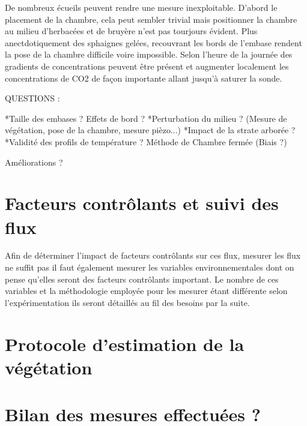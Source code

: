 De nombreux écueils peuvent rendre une mesure inexploitable. D'abord le placement de la chambre, cela peut sembler trivial mais positionner la chambre au milieu d'herbacées et de bruyère n'est pas tourjours évident. Plus anectdotiquement des sphaignes gelées, recouvrant les bords de l'embase rendent la pose de la chambre difficile voire impossible. Selon l'heure de la journée des gradients de concentrations peuvent être présent et augmenter localement les concentrations de CO2 de façon importante allant jusqu'à saturer la sonde.

QUESTIONS :

*Taille des embases ? Effets de bord ?
*Perturbation du milieu ? (Mesure de végétation, pose de la chambre, mesure pièzo...)
*Impact de la strate arborée ?
*Validité des profils de température ?
Méthode de Chambre fermée (Biais ?)

Améliorations ? 


\section{Facteurs contrôlants et suivi des flux}
Afin de déterminer l'impact de facteurs contrôlants sur ces flux, mesurer les flux ne suffit pas il faut également mesurer les variables environnementales dont on pense qu'elles seront des facteurs contrôlants important. Le nombre de ces variables et la méthodologie employée pour les mesurer étant différente selon l'expérimentation ils seront détaillés au fil des besoins par la suite.

\section{Protocole d'estimation de la végétation}


\section*{Bilan des mesures effectuées ?}